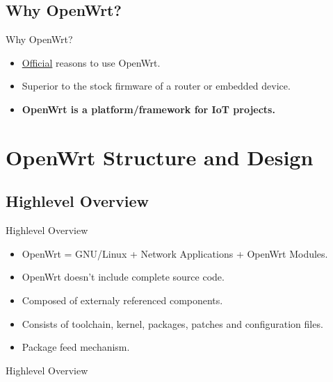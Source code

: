 \subsection{Why OpenWrt?}
\begin{frame}{Why OpenWrt?}
    \pause
    \begin{itemize}[<+-|alert@+>]
        \item \href{https://openwrt.org/reasons_to_use_lede}{Official} reasons to use OpenWrt.
        \item Superior to the stock firmware of a router or embedded device.
        \item \textbf{OpenWrt is a platform/framework for IoT projects.}
    \end{itemize}
\end{frame}

\section{OpenWrt Structure and Design}

\subsection{Highlevel Overview}
\begin{frame}{Highlevel Overview}
    \pause
    \begin{itemize}[<+-|alert@+>]
        \item OpenWrt = GNU/Linux + Network Applications + OpenWrt Modules.
        \item OpenWrt doesn't include complete source code.
        \item Composed of externaly referenced components.
        \item Consists of toolchain, kernel, packages, patches and configuration files.
        \item Package feed mechanism.
    \end{itemize}
\end{frame}

\begin{frame}{Highlevel Overview}
\end{frame}

